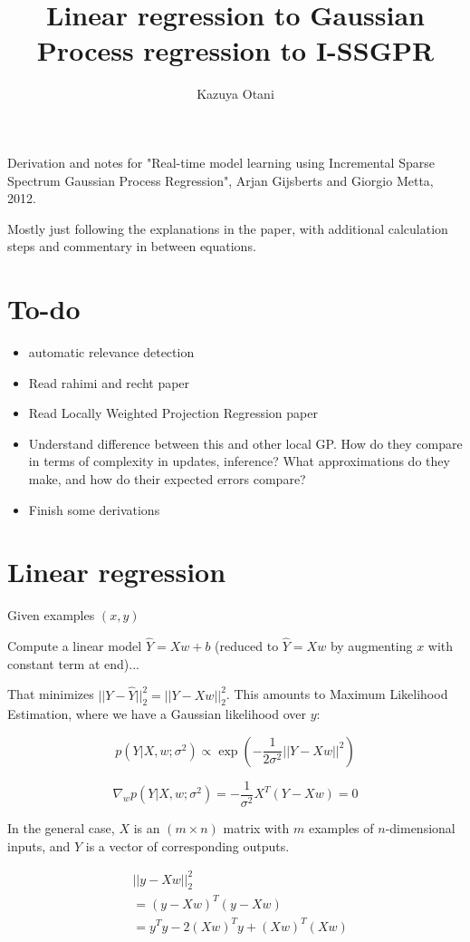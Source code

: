 \documentclass[a4paper]{article}
\title{Linear regression to Gaussian Process regression to I-SSGPR}
\author{Kazuya Otani}
\begin{document}
\maketitle

Derivation and notes for "Real-time model learning using Incremental Sparse Spectrum Gaussian Process Regression", Arjan Gijsberts and Giorgio Metta, 2012.

Mostly just following the explanations in the paper, with additional calculation steps and commentary in between equations.

\section*{To-do}

\begin{itemize}
	\item automatic relevance detection
    \item Read rahimi and recht paper
    \item Read Locally Weighted Projection Regression paper
    \item Understand difference between this and other local GP. How do they compare in terms of complexity in updates, inference? What approximations do they make, and how do their expected errors compare?
    \item Finish some derivations 
\end{itemize}

\section{Linear regression}

Given examples $(x,y)$

Compute a linear model $\hat{Y}=Xw+b$ (reduced to $\hat{Y}=Xw$ by augmenting $x$ with constant term at end)... 

That minimizes $||Y - \hat{Y}||_2^2 = ||Y - X w||_2^2$. This amounts to Maximum Likelihood Estimation, where we have a Gaussian likelihood over $y$:

$$p(Y|X,w;\sigma^2) \propto \exp(-\frac{1}{2\sigma^2} ||Y-Xw||^2)$$

$$\nabla_w p(Y|X,w; \sigma^2) = -\frac{1}{\sigma^2} X^T(Y-Xw)=0$$

In the general case, $X$ is an $(m \times n)$ matrix with $m$ examples of $n$-dimensional inputs, and $Y$ is a vector of corresponding outputs.

\begin{align*}
& ||y - X w||_2^2 \\
&= (y-Xw)^T (y-Xw) \\
&= y^T y - 2(Xw)^T y + (Xw)^T(Xw)
\end{align*}
\end{document}
